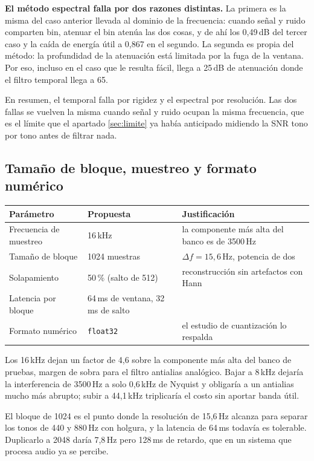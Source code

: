 \textbf{El método espectral falla por dos razones distintas.} La primera es la
misma del caso anterior llevada al dominio de la frecuencia: cuando señal y ruido
comparten bin, atenuar el bin atenúa las dos cosas, y de ahí los 0,49\,dB del
tercer caso y la caída de energía útil a 0,867 en el segundo. La segunda es
propia del método: la profundidad de la atenuación está limitada por la fuga de
la ventana. Por eso, incluso en el caso que le resulta fácil, llega a 25\,dB de
atenuación donde el filtro temporal llega a 65.

En resumen, el temporal falla por rigidez y el espectral por resolución. Las dos
fallas se vuelven la misma cuando señal y ruido ocupan la misma frecuencia, que
es el límite que el apartado \ref{sec:limite} ya había anticipado midiendo la SNR
tono por tono antes de filtrar nada.

\subsection{Tamaño de bloque, muestreo y formato numérico}

\begin{center}\small
\begin{tabular}{lll}
\toprule
Parámetro & Propuesta & Justificación \\
\midrule
Frecuencia de muestreo & 16\,kHz & la componente más alta del banco es de 3500\,Hz \\
Tamaño de bloque & 1024 muestras & $\Delta f = 15{,}6$\,Hz, potencia de dos \\
Solapamiento & 50\,\% (salto de 512) & reconstrucción sin artefactos con Hann \\
Latencia por bloque & 64\,ms de ventana, 32\,ms de salto & \\
Formato numérico & \texttt{float32} & el estudio de cuantización lo respalda \\
\bottomrule
\end{tabular}
\end{center}

Los 16\,kHz dejan un factor de 4,6 sobre la componente más alta del banco de
pruebas, margen de sobra para el filtro antialias analógico. Bajar a 8\,kHz
dejaría la interferencia de 3500\,Hz a solo 0,6\,kHz de Nyquist y obligaría a un
antialias mucho más abrupto; subir a 44,1\,kHz triplicaría el costo sin aportar
banda útil.

El bloque de 1024 es el punto donde la resolución de 15,6\,Hz alcanza para
separar los tonos de 440 y 880\,Hz con holgura, y la latencia de 64\,ms todavía
es tolerable. Duplicarlo a 2048 daría 7,8\,Hz pero 128\,ms de retardo, que en un
sistema que procesa audio ya se percibe.

